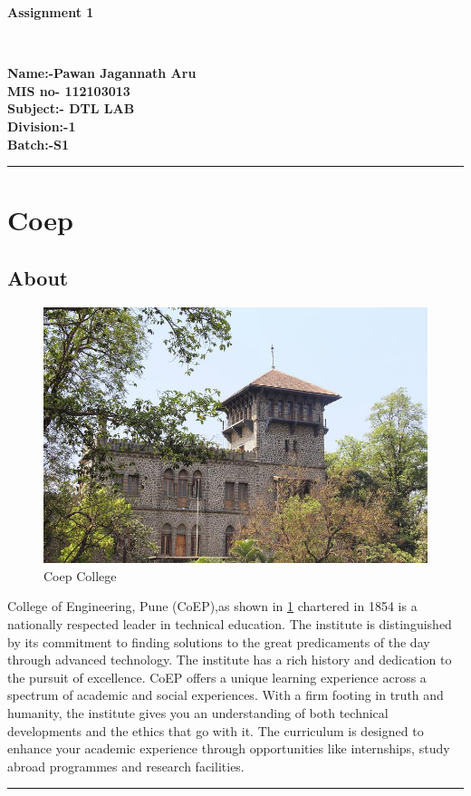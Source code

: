 \documentclass[12pt]{article}
\begin{document}
\begin{center}
{\Huge \bf Assignment 1}\\
\end{center}
\hrulefill\\
\begin{large}
\bf Name:-Pawan Jagannath Aru\\
\bf MIS no- 112103013\\
\bf Subject:- DTL LAB\\
\bf Division:-1\\
\bf Batch:-S1\\
\bf \date{today}
\end{large}
\hrule
{}
\tableofcontents

\newpage
\section{Coep}
\subsection{About}
\begin{figure}[h]                %
    \centering
    \includegraphics[scale=1]{coepcollege}
    \caption{Coep College}
    \label{fig:coep1}
\end{figure}

College of Engineering, Pune (CoEP),as shown in \ref{fig:coep1} chartered in 1854 is a nationally respected leader in technical education. The institute is distinguished by its commitment to finding solutions to the great predicaments of the day through advanced technology. The institute has a rich history and dedication to the pursuit of excellence. CoEP offers a unique learning experience across a spectrum of academic and social experiences. With a firm footing in truth and humanity, the institute gives you an understanding of both technical developments and the ethics that go with it. The curriculum is designed to enhance your academic experience through opportunities like internships, study abroad programmes and research facilities.\\ 
\hrule
\end{document}
